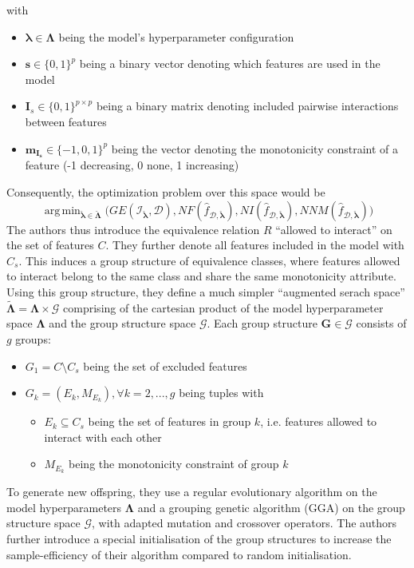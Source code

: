 \documentclass[twoside,11pt]{article}
\DeclareMathOperator*{\argmin}{arg\,min}
\begin{document}
with
\begin{itemize}
  \item $\boldsymbol\lambda\in\boldsymbol\Lambda$ being the model's hyperparameter configuration
  \item $\boldsymbol{s}\in\{0,1\}^p$ being a binary vector denoting which features are used in the model
  \item $\boldsymbol{I}_s\in\{0,1\}^{p\times p}$ being a binary matrix denoting included pairwise interactions between features
  \item $\boldsymbol{m}_{\boldsymbol{I}_{\boldsymbol{s}}}\in\{-1,0,1\}^p$ being the vector denoting the monotonicity constraint of a feature (-1 decreasing, 0 none, 1 increasing)
\end{itemize}
Consequently, the optimization problem over this space would be
\begin{equation}
  \argmin_{\check{\boldsymbol\lambda}\in\check{\boldsymbol\Lambda}} \big(
    GE(\mathcal{I}_{\check{\boldsymbol\lambda}},\mathcal{D}),
    NF(\hat{f}_{\mathcal{D},\check{\boldsymbol\lambda}}),
    NI(\hat{f}_{\mathcal{D},\check{\boldsymbol\lambda}}),
    NNM(\hat{f}_{\mathcal{D},\check{\boldsymbol\lambda}})
  \big)
  \label{eq-eagga-extended-space}
\end{equation}
The authors thus introduce the equivalence relation $R$ ``allowed to interact'' on the set of features $C$. They further denote all features included in the model with $C_s$.
This induces a group structure of equivalence classes, where features allowed to interact belong to the same class and share the same monotonicity attribute.
Using this group structure, they define a much simpler ``augmented serach space'' $\tilde{\boldsymbol\Lambda}=\boldsymbol\Lambda\times\mathcal{G}$ comprising of
the cartesian product of the model hyperparameter space $\boldsymbol\Lambda$ and the group structure space $\mathcal{G}$.
Each group structure $\boldsymbol{G}\in\mathcal{G}$ consists of $g$ groups:
\begin{itemize}
  \item $G_1=C\setminus C_s$ being the set of excluded features
  \item $G_k=(E_k,M_{E_k}), \forall k=2,...,g$ being tuples with
  \begin{itemize}
    \item $E_k\subseteq C_s$ being the set of features in group $k$, i.e. features allowed to interact with each other
    \item $M_{E_k}$ being the monotonicity constraint of group $k$
  \end{itemize}
\end{itemize}
To generate new offspring, they use a regular evolutionary algorithm on the model hyperparameters $\boldsymbol\Lambda$ and a grouping genetic algorithm (GGA) on
the group structure space $\mathcal{G}$, with adapted mutation and crossover operators.
The authors further introduce a special initialisation of the group structures to increase the sample-efficiency of their algorithm compared to random initialisation.
\citep[pp. 541-543]{EAGGA}
\end{document}
